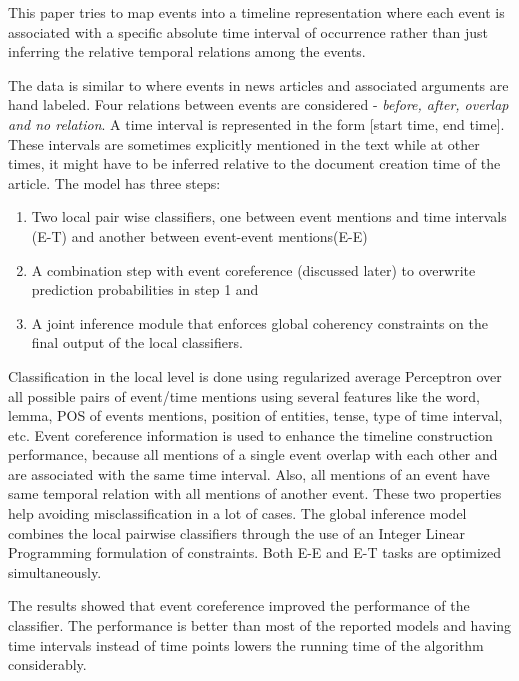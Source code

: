This paper tries to map events into a timeline representation where each event is associated with a specific absolute time interval of occurrence rather than just inferring the relative temporal relations among the events. 

The data is similar to \citeauthor{temporalordering} where events in news articles and associated arguments are hand labeled. Four relations between events are considered - {\em before, after, overlap and no relation}. A time interval is represented in the form [start time, end time]. These intervals are sometimes explicitly mentioned in the text while at other times, it might have to be inferred relative to the document creation time of the article. The model has three steps: 
\begin{enumerate}
\item Two local pair wise classifiers, one between event mentions and time intervals (E-T) and another between event-event mentions(E-E) 
\item A combination step with event coreference (discussed later) to overwrite prediction probabilities in step 1 and 
\item A joint inference  module that enforces global coherency constraints on the final output of the local classifiers. 
\end{enumerate}

Classification in the local level is done using regularized average Perceptron over all possible pairs of event/time mentions using several features like the word, lemma, POS of events mentions, position of entities, tense, type of time interval, etc. Event coreference information is used to enhance the timeline construction performance, because all mentions of a single event overlap with each other and are associated with the same time interval. Also, all mentions of an event have same temporal relation with all mentions of another event. These two properties help avoiding misclassification in a lot of cases. The global inference model combines the local pairwise classifiers through the use of an Integer Linear Programming formulation of constraints. Both E-E and E-T tasks are optimized simultaneously. 

The results showed that event coreference improved the performance of the classifier. The performance is better than most of the reported models and having time intervals instead of time points lowers the running time of the algorithm considerably. 


